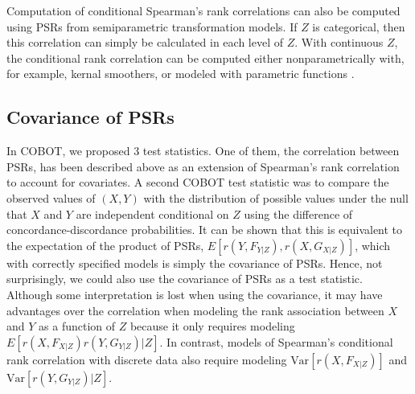 \documentclass[12pt, usenatbib]{article}
\begin{document}
Computation of conditional Spearman's rank correlations can also be computed using PSRs from semiparametric transformation models.  If $Z$ is categorical, then this correlation can simply be calculated in each level of $Z$.  With continuous $Z$, the conditional rank correlation can be computed either nonparametrically with, for example, kernal smoothers, or modeled with parametric functions \citep{liu2016}.  


\subsection{Covariance of PSRs}
In COBOT, we proposed 3 test statistics.  One of them, the correlation between PSRs, has been described above as an extension of Spearman's rank correlation to account for covariates.  A second COBOT test statistic was to compare the observed values of $(X,Y)$ with the distribution of possible values under the null that $X$ and $Y$ are independent conditional on $Z$ using the difference of concordance-discordance probabilities.  %
It can be shown that this is equivalent to the expectation of the product of PSRs, $E[r(Y,F_{Y|Z}),r(X,G_{X|Z})]$, which with correctly specified models is simply the covariance of PSRs.  Hence, not surprisingly, we could also use the covariance of PSRs as a test statistic.  Although some interpretation is lost when using the covariance, it may have advantages over the correlation when modeling the rank association between $X$ and $Y$ as a function of $Z$ because it only requires modeling $E[r(X, F_{X|Z})r(Y, G_{Y|Z})|Z]$.  In contrast, models of Spearman's conditional rank correlation with discrete data also require modeling $\text{Var}[r(X, F_{X|Z})]$ and $\text{Var}[r(Y, G_{Y|Z})|Z]$.


\end{document}
